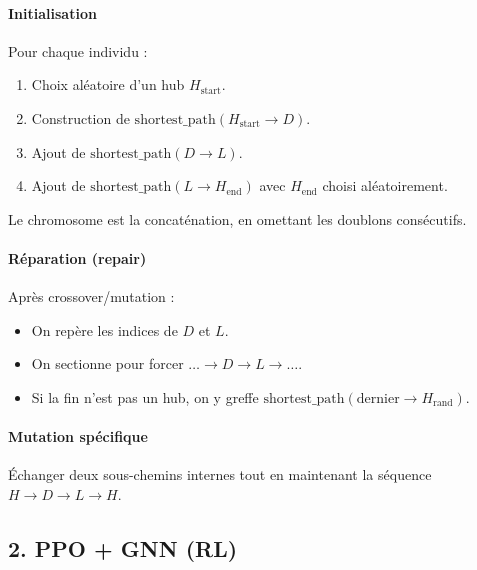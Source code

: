 \documentclass[11pt,a4paper]{article}
\begin{document}
\paragraph{Initialisation} Pour chaque individu :
\begin{enumerate}
  \item Choix aléatoire d'un hub \(H_{\text{start}}\).
  \item Construction de \(\mathrm{shortest\_path}(H_{\text{start}}\to D)\).
  \item Ajout de \(\mathrm{shortest\_path}(D\to L)\).
  \item Ajout de \(\mathrm{shortest\_path}(L\to H_{\text{end}})\) avec \(H_{\text{end}}\) choisi aléatoirement.
\end{enumerate}
Le chromosome est la concaténation, en omettant les doublons consécutifs.

\paragraph{Réparation (repair)} Après crossover/mutation :
\begin{itemize}
  \item On repère les indices de \(D\) et \(L\).
  \item On sectionne pour forcer \( \dots\to D\to L\to\dots\).
  \item Si la fin n'est pas un hub, on y greffe \(\mathrm{shortest\_path}(\text{dernier}\to H_{\text{rand}})\).
\end{itemize}

\paragraph{Mutation spécifique}  
Échanger deux sous-chemins internes tout en maintenant la séquence \(H\to D\to L\to H\).

\subsection{2. PPO + GNN (RL)}
\label{subsec:RL_constraints}
\end{document}
